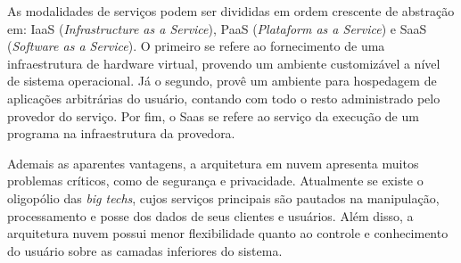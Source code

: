 \documentclass{article}
\begin{document}
As modalidades de serviços podem ser divididas em ordem crescente de abstração
em: IaaS (\textit{Infrastructure as a Service}), PaaS (\textit{Plataform as a
Service}) e SaaS (\textit{Software as a Service}). O primeiro se refere ao
fornecimento de uma infraestrutura de hardware virtual, provendo um ambiente
customizável a nível de sistema operacional. Já o segundo, provê um ambiente
para hospedagem de aplicações arbitrárias do usuário, contando com todo o resto
administrado pelo provedor do serviço. Por fim, o Saas se refere ao serviço da
execução de um programa na infraestrutura da provedora.

Ademais as aparentes vantagens, a arquitetura em nuvem apresenta muitos
problemas críticos, como de segurança e privacidade. Atualmente se existe o
oligopólio das \textit{big techs}, cujos serviços principais são pautados na
manipulação, processamento e posse dos dados de seus clientes e usuários. Além
disso, a arquitetura nuvem possui menor flexibilidade quanto ao controle e
conhecimento do usuário sobre as camadas inferiores do sistema.
\end{document}
